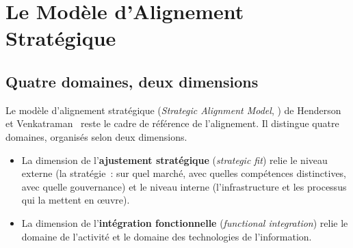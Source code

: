 \section{Le Modèle d'Alignement Stratégique}
\label{sec:c03-alignement}

\subsection{Quatre domaines, deux dimensions}

Le modèle d'alignement stratégique (\textit{Strategic Alignment Model},
) de Henderson et Venkatraman~\cite{henderson1993alignment}
reste le cadre de référence de l'alignement. Il distingue quatre domaines,
organisés selon deux dimensions.

\begin{itemize}
    \item La dimension de l'\textbf{ajustement stratégique}
          (\textit{strategic fit}) relie le niveau externe (la stratégie~:
          sur quel marché, avec quelles compétences distinctives, avec
          quelle gouvernance) et le niveau interne (l'infrastructure et les
          processus qui la mettent en œuvre).
    \item La dimension de l'\textbf{intégration fonctionnelle}
          (\textit{functional integration}) relie le domaine de l'activité
          et le domaine des technologies de l'information.
\end{itemize}


